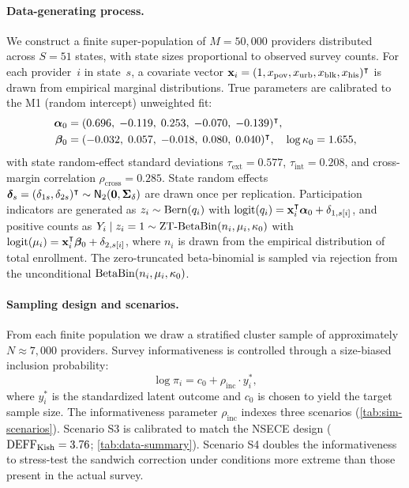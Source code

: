 \paragraph{Data-generating process.}
We construct a finite super-population of $M = 50{,}000$ providers
distributed across $S = 51$ states, with state sizes proportional to
observed survey counts. For each provider~$i$ in state~$s$, a
covariate vector $\mathbf{x}_i = (1, x_{\mathrm{pov}}, x_{\mathrm{urb}},
x_{\mathrm{blk}}, x_{\mathrm{his}})^\intercal$ is drawn from empirical
marginal distributions. True parameters are calibrated to the M1
(random intercept) unweighted fit:
\begin{align}\label{eq:sim-truth}
  \boldsymbol{\alpha}_0 &= (0.696,\; -0.119,\; 0.253,\; -0.070,\; -0.139)^\intercal, \notag\\
  \boldsymbol{\beta}_0  &= (-0.032,\; 0.057,\; -0.018,\; 0.080,\; 0.040)^\intercal, \quad
  \log\kappa_0 = 1.655,
\end{align}
with state random-effect standard deviations $\tau_{\mathrm{ext}} = 0.577$,
$\tau_{\mathrm{int}} = 0.208$, and cross-margin correlation
$\rho_{\mathrm{cross}} = 0.285$. State random effects
$\boldsymbol{\delta}_s = (\delta_{1s}, \delta_{2s})^\intercal \sim \textsf{N}_2(\mathbf{0},
\boldsymbol{\Sigma}_\delta)$ are drawn once per replication.
Participation indicators are generated as
$z_i \sim \operatorname{Bern}(q_i)$ with $\operatorname{logit}(q_i) = \mathbf{x}_i^\intercal \boldsymbol{\alpha}_0 +
\delta_{1,s[i]}$, and positive counts as
$Y_i \mid z_i = 1 \sim \operatorname{ZT\text{-}BetaBin}(n_i, \mu_i, \kappa_0)$
with $\operatorname{logit}(\mu_i) = \mathbf{x}_i^\intercal \boldsymbol{\beta}_0 + \delta_{2,s[i]}$,
where $n_i$ is drawn from the empirical distribution of total enrollment.
The zero-truncated beta-binomial is sampled via rejection from the
unconditional $\operatorname{BetaBin}(n_i, \mu_i, \kappa_0)$.

\paragraph{Sampling design and scenarios.}
From each finite population we draw a stratified cluster sample of
approximately $N \approx 7{,}000$ providers. Survey informativeness is
controlled through a size-biased inclusion probability:
\begin{equation}\label{eq:sim-inclusion}
  \log \pi_i = c_0 + \rho_{\mathrm{inc}} \cdot y_i^{*},
\end{equation}
where $y_i^{*}$ is the standardized latent outcome and $c_0$ is chosen to
yield the target sample size. The informativeness parameter
$\rho_{\mathrm{inc}}$ indexes three scenarios (\cref{tab:sim-scenarios}).
Scenario S3 is calibrated to match the NSECE design
($\text{DEFF}_{\mathrm{Kish}} = 3.76$; \cref{tab:data-summary}). Scenario S4
doubles the informativeness to stress-test the sandwich correction under
conditions more extreme than those present in the actual survey.

